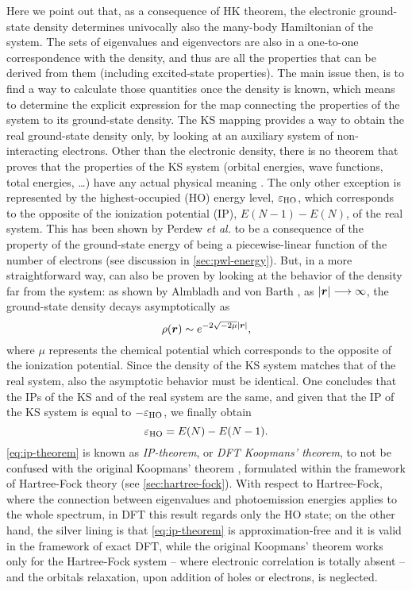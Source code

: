 Here we point out that, as a consequence of HK theorem, the electronic ground-state density determines univocally also the many-body Hamiltonian of the system. The sets of eigenvalues and eigenvectors are also in a one-to-one correspondence with the density, and thus are all the properties that can be derived from them (including excited-state properties). The main issue then, is to find a way to calculate those quantities once the density is known, which means to determine the explicit expression for the map connecting the properties of the system to its ground-state density. The KS mapping provides a way to obtain the real ground-state density only, by looking at an auxiliary system of non-interacting electrons. Other than the electronic density, there is no theorem that proves that the properties of the KS system (orbital energies, wave functions, total energies, \dots) have any actual physical meaning \cite{martin_interacting_2016}. The only other exception is represented by the highest-occupied (HO) energy level, $\varepsilon_{\rm HO}$, which corresponds to the opposite of the ionization potential (IP), $E(N-1) - E(N)$, of the real system. This has been shown by Perdew \emph{et al.} \cite{perdew_density-functional_1982} to be a consequence of the property of the ground-state energy of being a piecewise-linear function of the number of electrons (see discussion in \cref{sec:pwl-energy}). But, in a more straightforward way, can also be proven by looking at the behavior of the density far from the system: as shown by Almbladh and von Barth \cite{almbladh_exact_1985}, as $|{\bm r}| \longrightarrow \infty$, the ground-state density decays asymptotically as
%
\begin{equation}
    \rho({\bm r}) \sim e^{-2\sqrt{-2\mu}|{\bm r}|} ,
    \label{eq:exp-decay-density}
\end{equation}
%
where $\mu$ represents the chemical potential which corresponds to the opposite of the ionization potential. Since the density of the KS system matches that of the real system, also the asymptotic behavior must be identical. One concludes that the IPs of the KS and of the real system are the same, and given that the IP of the KS system is equal to $-\varepsilon_{\rm HO}$, we finally obtain
%
\begin{equation}
    \varepsilon_{\rm HO} = E(N) - E(N-1) .
    \label{eq:ip-theorem}
\end{equation}
%
\cref{eq:ip-theorem} is known as \emph{IP-theorem}, or \emph{DFT Koopmans' theorem}, to not be confused with the original Koopmans' theorem \cite{koopmans_uber_1934}, formulated within the framework of Hartree-Fock theory (see \cref{sec:hartree-fock}). With respect to Hartree-Fock, where the connection between eigenvalues and photoemission energies applies to the whole spectrum, in DFT this result regards only the HO state; on the other hand, the silver lining is that \cref{eq:ip-theorem} is approximation-free and it is valid in the framework of exact DFT, while the original Koopmans' theorem works only for the Hartree-Fock system -- where electronic correlation is totally absent -- and the orbitals relaxation, upon addition of holes or electrons, is neglected.

